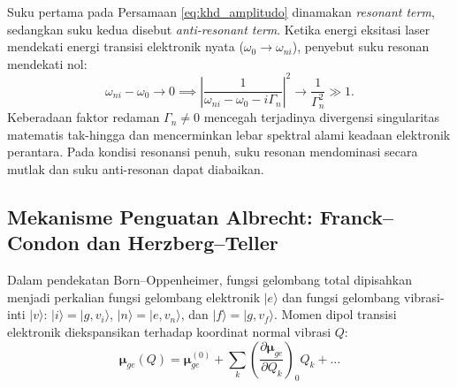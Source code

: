 Suku pertama pada Persamaan \eqref{eq:khd_amplitudo} dinamakan \textit{resonant term}, sedangkan suku kedua disebut \textit{anti-resonant term}. Ketika energi eksitasi laser mendekati energi transisi elektronik nyata ($\omega_0 \to \omega_{ni}$), penyebut suku resonan mendekati nol:
\begin{equation}
\omega_{ni} - \omega_0 \to 0 \implies \left| \frac{1}{\omega_{ni} - \omega_0 - i\Gamma_n} \right|^2 \to \frac{1}{\Gamma_n^2} \gg 1.
\label{eq:resonansi_dominasi}
\end{equation}
Keberadaan faktor redaman $\Gamma_n \neq 0$ mencegah terjadinya divergensi singularitas matematis tak-hingga dan mencerminkan lebar spektral alami keadaan elektronik perantara. Pada kondisi resonansi penuh, suku resonan mendominasi secara mutlak dan suku anti-resonan dapat diabaikan.

\subsection{Mekanisme Penguatan Albrecht: Franck--Condon dan Herzberg--Teller}
Dalam pendekatan Born--Oppenheimer, fungsi gelombang total dipisahkan menjadi perkalian fungsi gelombang elektronik $|e\rangle$ dan fungsi gelombang vibrasi-inti $|v\rangle$: $|i\rangle = |g, v_i\rangle$, $|n\rangle = |e, v_n\rangle$, dan $|f\rangle = |g, v_f\rangle$. Momen dipol transisi elektronik diekspansikan terhadap koordinat normal vibrasi $Q$:
\begin{equation}
\boldsymbol{\mu}_{ge}(Q) = \boldsymbol{\mu}_{ge}^{(0)} + \sum_k \left( \frac{\partial \boldsymbol{\mu}_{ge}}{\partial Q_k} \right)_0 Q_k + \dots
\end{equation}

